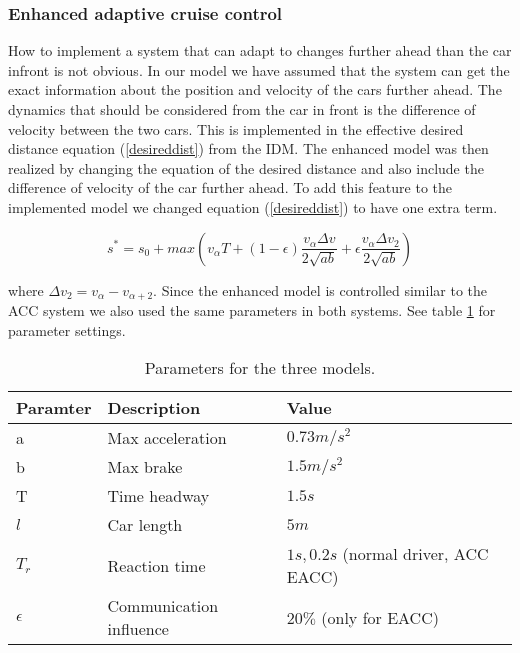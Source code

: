 \subsubsection {Enhanced adaptive cruise control}
How to implement a system that can adapt to changes further ahead than the
car infront is not obvious. In our model we have assumed that the system
can get the exact information about the position and velocity of the cars
further ahead.  The dynamics that should be considered from the car in front
is the difference of velocity between the two cars. This is implemented in
the effective desired distance equation (\ref{desireddist}) from
the IDM. The enhanced model was then realized by changing the equation of
the desired distance and also include the difference of velocity of the
car further ahead. To add this feature to the implemented model we changed
equation (\ref{desireddist}) to have one extra term.

\begin{equation}
s^\ast = s_0 + max(v_\alpha T + (1-\epsilon
)\frac{v_\alpha \Delta v}{2\sqrt{ab}} + \epsilon \frac{v_\alpha \Delta
v_2}{2\sqrt{ab}})
\end{equation}

where $ \Delta v_2 = v_\alpha - v_{\alpha +2} $.  Since the enhanced model
is controlled similar to the ACC system we also used the same parameters in
both systems. See table \ref{config} for parameter settings.

\begin{center}
\begin{table}[H]
\begin{tabular}{| l | l | l |} \hline
Paramter & Description & Value\\ \hline
a & Max acceleration & $ 0.73 \unit{m/s^2} $\\ \hline
b & Max brake & $ 1.5 \unit{m/s^2} $\\ \hline
T & Time headway & $ 1.5 \unit{s} $ \\ \hline
$ l $ & Car length & $ 5 \unit{m} $ \\ \hline
$ T_r $ & Reaction time & $ 1 \unit{s}, 0.2 \unit{s} $ (normal driver, ACC\/ EACC) \\ \hline
$ \epsilon $ & Communication influence & $ 20 \% $ (only for EACC) \\ \hline
\end{tabular}
\caption{\label{config} Parameters for the three models.}
\end{table}
\end{center}


